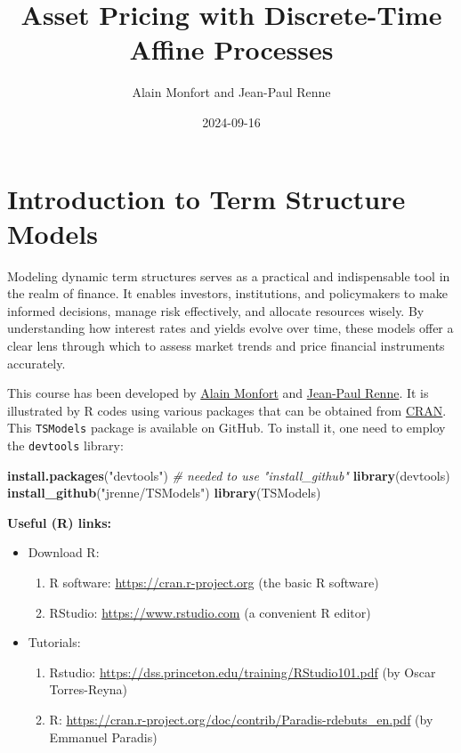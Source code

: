 \documentclass[
  12pt,
]{book}
\title{Asset Pricing with Discrete-Time Affine Processes}
\author{Alain Monfort and Jean-Paul Renne}
\date{2024-09-16}
\newenvironment{Shaded}{\begin{snugshade}}{\end{snugshade}}
\newcommand{\CommentTok}[1]{\textcolor[rgb]{0.56,0.35,0.01}{\textit{#1}}}
\newcommand{\FunctionTok}[1]{\textcolor[rgb]{0.13,0.29,0.53}{\textbf{#1}}}
\newcommand{\NormalTok}[1]{#1}
\newcommand{\StringTok}[1]{\textcolor[rgb]{0.31,0.60,0.02}{#1}}
\providecommand{\tightlist}{%
  \setlength{\itemsep}{0pt}\setlength{\parskip}{0pt}}
\theoremstyle{definition}
\theoremstyle{definition}
\theoremstyle{definition}
\theoremstyle{definition}
\theoremstyle{remark}
\begin{document}
\maketitle

{
\setcounter{tocdepth}{1}
\tableofcontents
}
\newcommand{\bv}[1]{\mathbf{#1}}

\hypertarget{intro}{%
\chapter*{Introduction to Term Structure Models}\label{intro}}

Modeling dynamic term structures serves as a practical and indispensable tool in the realm of finance. It enables investors, institutions, and policymakers to make informed decisions, manage risk effectively, and allocate resources wisely. By understanding how interest rates and yields evolve over time, these models offer a clear lens through which to assess market trends and price financial instruments accurately.

This course has been developed by \href{https://faculty.crest.fr/amonfort/}{Alain Monfort} and \href{https://sites.google.com/site/jeanpaulrenne/home}{Jean-Paul Renne}. It is illustrated by R codes using various packages that can be obtained from \href{https://cran.r-project.org}{CRAN}. This \texttt{TSModels} package is available on GitHub. To install it, one need to employ the \texttt{devtools} library:

\begin{Shaded}
\begin{Highlighting}[]
\FunctionTok{install.packages}\NormalTok{(}\StringTok{"devtools"}\NormalTok{) }\CommentTok{\# needed to use "install\_github"}
\FunctionTok{library}\NormalTok{(devtools)}
\FunctionTok{install\_github}\NormalTok{(}\StringTok{"jrenne/TSModels"}\NormalTok{)}
\FunctionTok{library}\NormalTok{(TSModels)}
\end{Highlighting}
\end{Shaded}

\textbf{Useful (R) links:}

\begin{itemize}
\item
  Download R:

  \begin{enumerate}
  \def\labelenumi{\alph{enumi}.}
  \tightlist
  \item
    R software: \url{https://cran.r-project.org} (the basic R software)
  \item
    RStudio: \url{https://www.rstudio.com} (a convenient R editor)
  \end{enumerate}
\item
  Tutorials:

  \begin{enumerate}
  \def\labelenumi{\alph{enumi}.}
  \tightlist
  \item
    Rstudio: \url{https://dss.princeton.edu/training/RStudio101.pdf} (by Oscar Torres-Reyna)
  \item
    R: \url{https://cran.r-project.org/doc/contrib/Paradis-rdebuts_en.pdf} (by Emmanuel Paradis)
  \end{enumerate}
\end{itemize}
\end{document}
